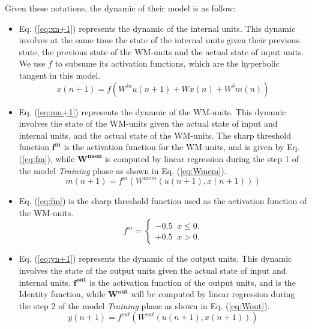 Given these notations, the dynamic of their model is as follow: 
\begin{itemize}
    \item Eq. (\ref{eq:xn+1}) represents the dynamic of the internal units. This dynamic involves at the same time the state of the internal units given their previous state, the previous state of the WM-units and the actual state of input units. We use $\mathbf{}{f}$ to subsume its activation functions, which are the hyperbolic tangent in this model.
    \begin{equation} \label{eq:xn+1}
        x(n+1) = f(W^{in}u(n+1) + Wx(n) + W^{b}m(n))
    \end{equation}
    
    \item Eq. (\ref{eq:mn+1}) represents the dynamic of the WM-units. This dynamic involves the state of the WM-units given the actual state of input and internal units, and the actual state of the WM-units. The sharp threshold function $\mathbf{f^{m}}$ is the activation function for the WM-units, and is given by Eq. (\ref{eq:fm}), while $\mathbf{W^{mem}}$ is computed by linear regression during the step 1 of the model \textit{Training} phase as shown in Eq. (\ref{eq:Wmem}).
    \begin{equation} \label{eq:mn+1}
        m(n+1) = f^{m}(W^{mem}(u(n+1), x(n+1)))
    \end{equation}
    
    \item Eq. (\ref{eq:fm}) is the sharp threshold function used as the activation function of the WM-units.
    \begin{equation} \label{eq:fm}
        f^{m} = \begin{cases}
            -0.5 \; \; x\leq 0. \\
            +0.5 \; \; x>0. \end{cases}
    \end{equation}
    
    \item Eq. (\ref{eq:yn+1}) represents the dynamic of the output units. This dynamic involves the state of the output units given the actual state of input and internal units. $\mathbf{f^{out}}$ is the activation function of the output units, and is the Identity function, while $\mathbf{W^{out}}$ will be computed by linear regression during the step 2 of the model \textit{Training} phase as shown in Eq. (\ref{eq:Wout}).
    \begin{equation} \label{eq:yn+1}
        y(n+1) = f^{out}(W^{out}(u(n+1), x(n+1)))
    \end{equation}
    

\end{itemize}
